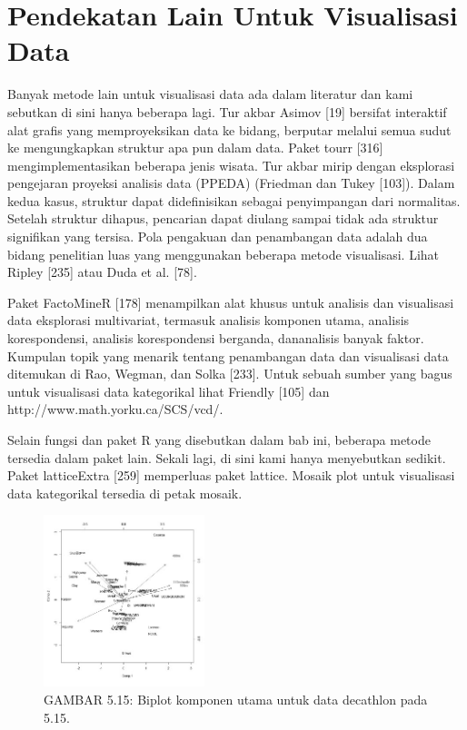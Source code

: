 \documentclass[a4paper,12pt]{article}
\theoremstyle{definition}
\begin{document}
\section{  Pendekatan Lain Untuk Visualisasi Data}

Banyak metode lain untuk visualisasi data ada dalam literatur dan kami sebutkan di sini hanya beberapa lagi. Tur akbar Asimov [19] bersifat interaktif alat grafis yang memproyeksikan data ke bidang, berputar melalui semua sudut ke mengungkapkan struktur apa pun dalam data. Paket tourr [316] mengimplementasikan beberapa jenis wisata. Tur akbar mirip dengan eksplorasi pengejaran proyeksi analisis data (PPEDA) (Friedman dan Tukey [103]). Dalam kedua kasus, struktur dapat didefinisikan sebagai penyimpangan dari normalitas. Setelah struktur dihapus, pencarian dapat diulang sampai tidak ada struktur signifikan yang tersisa. Pola pengakuan dan penambangan data adalah dua bidang penelitian luas yang menggunakan beberapa metode visualisasi. Lihat Ripley [235] atau Duda et al. [78].

Paket FactoMineR [178] menampilkan alat khusus untuk analisis dan visualisasi data eksplorasi multivariat, termasuk analisis komponen utama, analisis korespondensi, analisis korespondensi berganda, dananalisis banyak faktor. Kumpulan topik yang menarik tentang penambangan data dan visualisasi data ditemukan di Rao, Wegman, dan Solka [233]. Untuk sebuah sumber yang bagus untuk visualisasi data kategorikal lihat Friendly [105] dan http://www.math.yorku.ca/SCS/vcd/.

 Selain fungsi dan paket R yang disebutkan dalam bab ini, beberapa metode tersedia dalam paket lain. Sekali lagi, di sini kami hanya menyebutkan sedikit. Paket latticeExtra [259] memperluas paket lattice. Mosaik plot untuk visualisasi data kategorikal tersedia di petak mosaik.   

\begin{figure} [H]
    \centering
    \includegraphics[height=5cm]{gb/gambar 5.15.jpg}
    \caption{GAMBAR 5.15: Biplot komponen utama untuk data decathlon pada 5.15.}
  \label{fig:my_label}
\end{figure}
\end{document}
